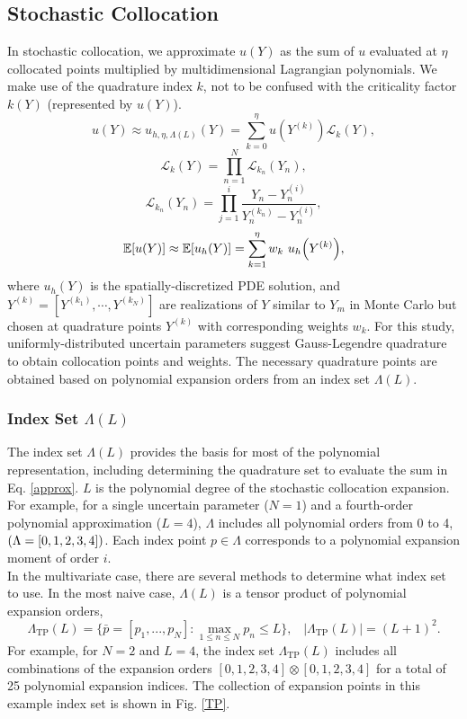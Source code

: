 \documentclass[11pt]{article}
\newcommand{\expv}[1]{\ensuremath{\mathbb{E}[ #1]}}
\begin{document}
\subsection{Stochastic Collocation}
In stochastic collocation, we approximate $u(Y)$ as the sum of $u$ evaluated at $\eta$ collocated points multiplied by multidimensional Lagrangian polynomials.  We make use of the quadrature index $k$, not to be confused with the criticality factor $k(Y)$ (represented by $u(Y)$).
\begin{equation}\label{approx}
u(Y)\approx u_{h,\eta,\Lambda(L)}(Y)=\sum_{k=0}^\eta u(Y^{(k)})\mathcal{L}_k(Y),
\end{equation}
\begin{equation}
\mathcal{L}_k(Y)=\prod_{n=1}^N \mathcal{L}_{k_n}(Y_n),
\end{equation}
\begin{equation}
\mathcal{L}_{k_n}(Y_n)=\prod_{j=1}^i \frac{Y_n-Y_n^{(i)}}{Y_n^{(k_n)}-Y_n^{(i)}},
\end{equation}
\begin{equation}
\expv{u(Y)}\approx\expv{u_h(Y)}=\sum_{k=1}^\eta w_k ~u_h\qty(Y^{(k)}),
\end{equation}
where $u_h(Y)$ is the spatially-discretized PDE solution, and $Y^{(k)}=[Y^{(k_1)},\cdots,Y^{(k_N)}]$ are realizations of $Y$ similar to $Y_m$ in Monte Carlo but chosen at quadrature points $Y^{(k)}$ with corresponding weights $w_k$.  For this study, uniformly-distributed uncertain parameters suggest Gauss-Legendre quadrature to obtain collocation points and weights.  The necessary quadrature points are obtained based on polynomial expansion orders from an index set $\Lambda(L)$.

\subsubsection{Index Set $\Lambda(L)$}
The index set $\Lambda(L)$ provides the basis for most of the polynomial representation, including determining the quadrature set to evaluate the sum in Eq. \ref{approx}.  $L$ is the polynomial degree of the stochastic collocation expansion.  For example, for a single uncertain parameter ($N=1$) and a fourth-order polynomial approximation ($L=4$), $\Lambda$ includes all polynomial orders from 0 to 4, $\qty(\Lambda=[0,1,2,3,4])$.  Each index point $p\in\Lambda$ corresponds to a polynomial expansion moment of order $i$.\\

In the multivariate case, there are several methods to determine what index set to use.
In the most naive case, $\Lambda(L)$ is a tensor product of polynomial expansion orders,
\begin{equation}
\Lambda_\text{TP}(L)=\Big\{\bar p=[p_1,...,p_N]: \max_{1\leq n\leq N}p_n\leq L \Big\},\hspace{10pt}|\Lambda_\text{TP}(L)|=(L+1)^2.
\end{equation}
For example, for $N=2$ and $L=4$, the index set $\Lambda_\text{TP}(L)$ includes all combinations of the expansion orders $[0,1,2,3,4]\otimes[0,1,2,3,4]$ for a total of 25 polynomial expansion indices.  The collection of expansion points in this example index set is shown in Fig. \ref{TP}.  \\
\end{document}
